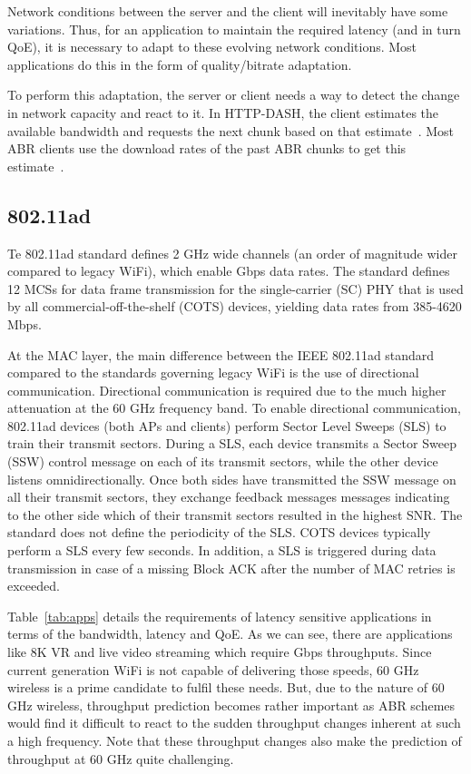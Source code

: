 \documentclass[sigconf,anonymous]{acmart}
\begin{document}
Network conditions between the server and the client will inevitably have some variations. Thus, for an application to maintain the required latency (and in turn QoE), it is necessary to adapt to these evolving network conditions. Most applications do this in the form of quality/bitrate adaptation.

To perform this adaptation, the server or client needs a way to detect the change in network capacity and react to it. In HTTP-DASH, the client estimates the available bandwidth and requests the next chunk based on that estimate~\cite{stockhammer:mmsys2011}. Most ABR clients use the download rates of the past ABR chunks to get this estimate~\cite{bentaleb:cst2019}.

\subsection{802.11ad}

Te 802.11ad standard defines 2 GHz wide channels (an order of magnitude wider compared to legacy WiFi), which enable Gbps data rates. The standard defines 12 MCSs for data frame transmission for the single-carrier (SC) PHY that is used by all commercial-off-the-shelf (COTS) devices, yielding data rates from 385-4620 Mbps. 

At the MAC layer, the main difference between the IEEE 802.11ad standard compared to the standards governing legacy WiFi is the use of directional communication. Directional communication is required due to the much higher attenuation at the 60 GHz frequency band. To enable directional communication, 802.11ad devices (both APs and clients) perform Sector Level Sweeps (SLS) to train their transmit sectors. During a SLS, each device transmits a Sector Sweep (SSW) control message on each of its transmit sectors, while the other device listens omnidirectionally. Once both sides have transmitted the SSW message on all their transmit sectors, they exchange feedback messages messages indicating to the other side which of their transmit sectors resulted in the highest SNR. The standard does not define the periodicity of the SLS. COTS devices typically perform a SLS every few seconds. In addition, a SLS is triggered during data transmission in case of a missing Block ACK after the number of MAC retries is exceeded.

Table~\ref{tab:apps} details the requirements of latency sensitive applications in terms of the bandwidth, latency and QoE. As we can see, there are applications like 8K VR and live video streaming which require Gbps throughputs. Since current generation WiFi is not capable of delivering those speeds, 60 GHz wireless is a prime candidate to fulfil these needs. But, due to the nature of 60 GHz wireless, throughput prediction becomes rather important as ABR schemes would find it difficult to react to the sudden throughput changes inherent at such a high frequency. Note that these throughput changes also make the prediction of throughput at 60 GHz quite challenging.
\end{document}
